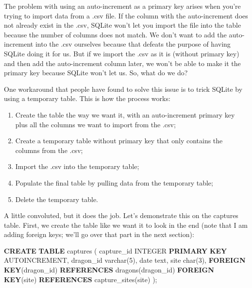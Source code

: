 \documentclass[
]{book}
\newenvironment{Shaded}{\begin{snugshade}}{\end{snugshade}}
\newcommand{\DataTypeTok}[1]{\textcolor[rgb]{0.13,0.29,0.53}{#1}}
\newcommand{\DecValTok}[1]{\textcolor[rgb]{0.00,0.00,0.81}{#1}}
\newcommand{\KeywordTok}[1]{\textcolor[rgb]{0.13,0.29,0.53}{\textbf{#1}}}
\newcommand{\NormalTok}[1]{#1}
\providecommand{\tightlist}{%
  \setlength{\itemsep}{0pt}\setlength{\parskip}{0pt}}
\begin{document}
The problem with using an auto-increment as a primary key arises when you're
trying to import data from a .csv file. If the column with the auto-increment
does not already exist in the .csv, SQLite won't let you import the file into
the table because the number of columns does not match. We don't want to add the
auto-increment into the .csv ourselves because that defeats the purpose of
having SQLite doing it for us. But if we import the .csv as it is (without
primary key) and then add the auto-increment column later, we won't be able to
make it the primary key because SQLite won't let us. So, what do we do?

One workaround that people have found to solve this issue is to trick SQLite by
using a temporary table. This is how the process works:

\begin{enumerate}
\def\labelenumi{\arabic{enumi}.}
\tightlist
\item
  Create the table the way we want it, with an auto-increment primary key plus
  all the columns we want to import from the .csv;
\item
  Create a temporary table without primary key that only contains the columns
  from the .csv;
\item
  Import the .csv into the temporary table;
\item
  Populate the final table by pulling data from the temporary table;
\item
  Delete the temporary table.
\end{enumerate}

A little convoluted, but it does the job. Let's demonstrate this on the captures
table. First, we create the table like we want it to look in the end (note that
I am adding foreign keys; we'll go over that part in the next section):

\begin{Shaded}
\begin{Highlighting}[]
\KeywordTok{CREATE} \KeywordTok{TABLE}\NormalTok{ captures (}
\NormalTok{capture\_id }\DataTypeTok{INTEGER} \KeywordTok{PRIMARY} \KeywordTok{KEY}\NormalTok{ AUTOINCREMENT,}
\NormalTok{dragon\_id }\DataTypeTok{varchar}\NormalTok{(}\DecValTok{5}\NormalTok{),}
\DataTypeTok{date}\NormalTok{ text,}
\NormalTok{site }\DataTypeTok{char}\NormalTok{(}\DecValTok{3}\NormalTok{),}
\KeywordTok{FOREIGN} \KeywordTok{KEY}\NormalTok{(dragon\_id) }\KeywordTok{REFERENCES}\NormalTok{ dragons(dragon\_id)}
\KeywordTok{FOREIGN} \KeywordTok{KEY}\NormalTok{(site) }\KeywordTok{REFERENCES}\NormalTok{ capture\_sites(site)}
\NormalTok{);}
\end{Highlighting}
\end{Shaded}
\end{document}
